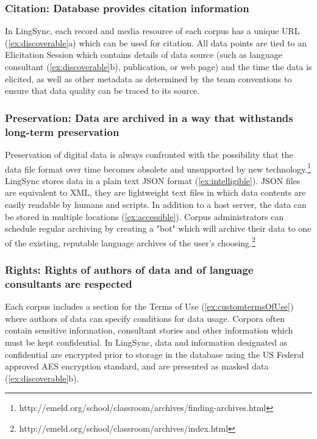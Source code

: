 \documentclass[letterpaper, 12pt, dvips]{mitwpl}
\begin{document}
\subsubsection{\textbf{Citation}: Database provides citation information} 
 
In LingSync, each record  and media resource of each corpus has a unique URL (\ref{ex:discoverable}a) which can be used for citation. 
All data points are tied to an Elicitation Session which contains details of data source (such as language consultant (\ref{ex:discoverable}b), publication, or web page) and the time the data is elicited, as well as other metadata as determined by the team conventions to ensure that data quality can be traced to its source. 

\subsubsection{\textbf{Preservation}: Data are archived in a way that withstands long-term preservation}

Preservation of digital data is always confronted with the possibility that the data file format over time becomes obsolete and unsupported by new technology.\footnote{http://emeld.org/school/classroom/archives/finding-archives.html} LingSync stores data in a plain text JSON format  (\ref{ex:intelligible}). 
JSON files  are equivalent to XML, they are lightweight text files in which data contents are easily readable by humans and scripts. In addition to a host server, the data can be stored in multiple locations  (\ref{ex:accessible}). 
Corpus administrators  can schedule regular archiving by creating a "bot" which will archive their data to one of the existing, reputable language archives of the user's choosing.\footnote{http://emeld.org/school/classroom/archives/index.html} 


\subsubsection{\textbf{Rights}: Rights of authors of data and of language consultants are respected}

Each corpus includes a section for the Terms of Use (\ref{ex:customtermsOfUse}) where authors of data can specify conditions for data usage. 
Corpora often contain sensitive information, consultant stories and other information which must be kept confidential. 
In LingSync, data and information designated as confidential are encrypted prior to storage in the database using the US Federal approved AES encryption standard, and are presented as masked data (\ref{ex:discoverable}b). 
\end{document}
